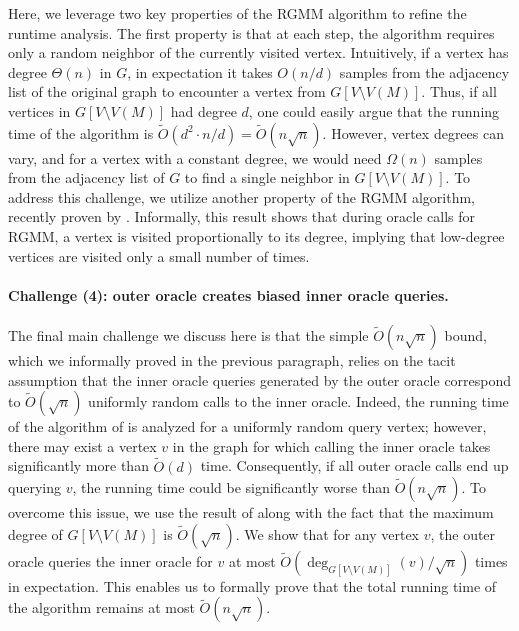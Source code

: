 \documentclass[letterpaper,11pt]{article}
\newcommand{\wt}[1]{\ensuremath{\widetilde{#1}}}
\begin{document}
Here, we leverage two key properties of the RGMM algorithm to refine the runtime analysis. The first property is that at each step, the algorithm requires only a random neighbor of the currently visited vertex. Intuitively, if a vertex has degree $\Theta(n)$ in $G$, in expectation it takes $O(n/d)$ samples from the adjacency list of the original graph to encounter a vertex from $G[V \setminus V(M)]$. Thus, if all vertices in $G[V \setminus V(M)]$ had degree $d$, one could easily argue that the running time of the algorithm is $\wt{O}(d^2 \cdot n/d) = \wt{O}(n\sqrt{n})$. However, vertex degrees can vary, and for a vertex with a constant degree, we would need $\Omega(n)$ samples from the adjacency list of $G$ to find a single neighbor in $G[V \setminus V(M)]$. To address this challenge, we utilize another property of the RGMM algorithm, recently proven by \cite{steiner-tree-itcs}. Informally, this result shows that
during oracle calls for RGMM,
a vertex is visited proportionally to its degree, implying that low-degree vertices are visited only a small number of times.  


\paragraph{Challenge (4): outer oracle creates biased inner oracle queries.} The final main challenge we discuss here is that the simple $\wt{O}(n\sqrt{n})$ bound, which we informally proved in the previous paragraph, relies on the tacit assumption that the inner oracle queries generated by the outer oracle correspond to $\wt{O}(\sqrt{n})$ uniformly random calls to the inner oracle. Indeed, the running time of the algorithm of \cite{Behnezhad21} is analyzed for a uniformly random query vertex; however, there may exist a vertex $v$ in the graph for which calling the inner oracle takes significantly more than $\wt{O}(d)$ time. Consequently, if all outer oracle calls end up querying $v$, the running time could be significantly worse than $\wt{O}(n\sqrt{n})$.  To overcome this issue, we use the result of \cite{steiner-tree-itcs} along with the fact that the maximum degree of $G[V \setminus V(M)]$ is $\wt{O}(\sqrt{n})$. We show that for any vertex $v$, the outer oracle queries the inner oracle for $v$ at most $\wt{O}(\deg_{G[V \setminus V(M)]}(v) / \sqrt{n})$ times in expectation. This enables us to formally prove that the total running time of the algorithm remains at most $\wt{O}(n\sqrt{n})$.  
\end{document}
